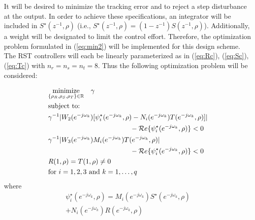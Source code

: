 \documentclass[a4paper, 10pt, conference]{ieeeconf}
\newcommand{\jok}{(e^{-j\omega_k})}
\newcommand{\jrok}{(e^{-j\omega_k},\rho)}
\begin{document}
It will be desired to minimize the tracking error and to reject a step disturbance at the output. In order to achieve these specifications, an integrator will be included in $S^{\star}(z^{-1},\rho)$ (i.e., $S^{\star}(z^{-1},\rho) = (1-z^{-1})S(z^{-1},\rho)$). Additionally, a weight will be designated to limit the control effort. Therefore, the optimization problem formulated in (\ref{eq:min2}) will be implemented for this design scheme. The RST controllers will each be linearly parameterized as in (\ref{eq:Rc}), (\ref{eq:Sc}), (\ref{eq:Tc}) with $n_r = n_s = n_t = 8$. Thus the following optimization problem will be considered:

\begin{equation} \label{eq:min_exp}
\begin{aligned}
& \underset{ \{\rho_R,\rho_S,\rho_T\} \in \mathbb{R}}{\text{minimize}} \quad \gamma\\
& \text{subject to:} \\
& \gamma^{-1} |W_2\jok[\psi_i^{\star}\jrok - N_i\jok T\jrok]|  \\ & \hspace{4.2cm} - \mathcal{R}e\{\psi_i^{\star}\jrok \}< 0  \\
& \gamma^{-1} |W_3\jok M_i\jok T\jrok|   \\ & \hspace{4.2cm}  - \mathcal{R}e\{\psi_i^{\star}\jrok \}< 0 \\
& R(1,\rho) = T(1,\rho) \neq 0 \\
& \mbox{for }i = 1,2,3 \ \mbox{and }k = 1,\ldots,q
\end{aligned}
\end{equation}
where 
\begin{eqnarray*}
\psi_i^{\star}\jrok = M_i\jok S^{\star}\jrok \\ +N_i\jok R\jrok
\end{eqnarray*}
\end{document}
